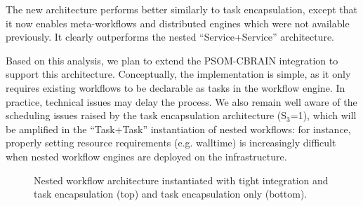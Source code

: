 \documentclass[preprint,3p,twocolumn]{elsarticle}
\newcommand{\correction}[1]{\color{blue}#1\color{black}\xspace}
\begin{document}
{The new architecture performs better similarly to task encapsulation,
except that it now enables meta-workflows and distributed engines
which were not available previously. It clearly outperforms the nested
``Service+Service'' architecture. 

Based on this analysis, we plan to extend the PSOM-CBRAIN integration
to support this architecture. Conceptually, the implementation is
simple, as it only requires existing workflows to be declarable as
tasks in the workflow engine. In practice, technical issues may delay
the process. We also remain well aware of the scheduling issues raised
by the task encapsulation architecture (S$_3$=1), which will be
amplified in the ``Task+Task'' instantiation of nested workflows: for
instance, properly setting resource requirements (e.g. walltime) is
increasingly difficult when nested workflow engines are deployed on
the infrastructure.  }

\begin{figure}
  \centering
{}
\caption{\correction{Nested workflow architecture instantiated with tight integration and task encapsulation (top) and task encapsulation only (bottom).}}
\label{fig:new-systems}
\end{figure}
\end{document}
